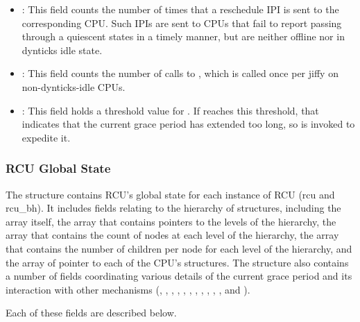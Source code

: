 \begin{itemize}
\item	{}:
	This field counts the number of times that a reschedule IPI
	is sent to the corresponding CPU.
	Such IPIs are sent to CPUs that fail to report passing through
	a quiescent states in a timely manner, but are neither offline
	nor in dynticks idle state.
\item	{}:
	This field counts the number of calls to ,
	which is called once per jiffy on non-dynticks-idle CPUs.
\item	{}:
	This field holds a threshold value for .
	If  reaches this threshold, that indicates
	that the current grace period has extended too long, so
	 is invoked to expedite it.
\end{itemize}

\subsubsection{RCU Global State}
\label{app:rcuimpl:rcutreewt:RCU Global State}

The  structure contains RCU's global state for
each instance of RCU (rcu and rcu\_bh).
It includes fields relating to
the hierarchy of  structures, including
the  array itself,
the  array that contains
pointers to the levels of the hierarchy,
the  array that contains the count of nodes at each level
of the hierarchy,
the  array that contains the number of children
per node for each level of the hierarchy,
and the  array of pointer to each of the CPU's
 structures.
The  structure also contains a number of fields
coordinating various details of the current grace period and its
interaction with other mechanisms (,
, , , ,
, , ,
, , ,
and ).

Each of these fields are described below.

